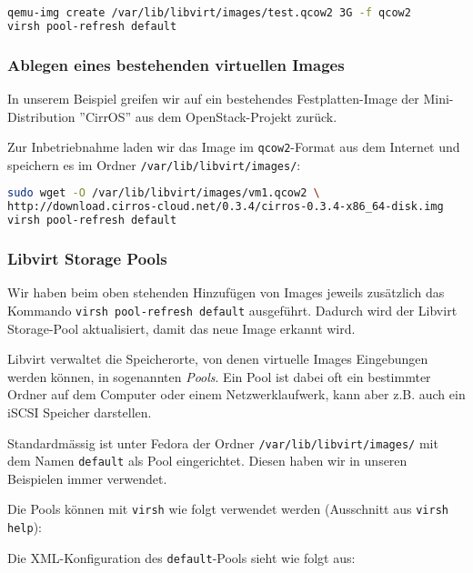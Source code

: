 \begin{lstlisting}[language=bash]
qemu-img create /var/lib/libvirt/images/test.qcow2 3G -f qcow2
virsh pool-refresh default
\end{lstlisting}


\subsubsection{Ablegen eines bestehenden virtuellen Images}

In unserem Beispiel greifen wir auf ein bestehendes Festplatten-Image der Mini-Distribution ''CirrOS'' aus dem OpenStack-Projekt zurück.

Zur Inbetriebnahme laden wir das Image im \lstinline|qcow2|-Format aus dem Internet und speichern es im Ordner \lstinline|/var/lib/libvirt/images/|:

\begin{lstlisting}[language=bash]
sudo wget -O /var/lib/libvirt/images/vm1.qcow2 \
http://download.cirros-cloud.net/0.3.4/cirros-0.3.4-x86_64-disk.img
virsh pool-refresh default
\end{lstlisting}

\subsubsection{Libvirt Storage Pools}

Wir haben beim oben stehenden Hinzufügen von Images jeweils zusätzlich das Kommando \lstinline|virsh pool-refresh default| ausgeführt. Dadurch wird der Libvirt Storage-Pool aktualisiert, damit das neue Image erkannt wird.

Libvirt verwaltet die Speicherorte, von denen virtuelle Images Eingebungen werden können, in sogenannten \emph{Pools}. Ein Pool ist dabei oft ein bestimmter Ordner auf dem Computer oder einem Netzwerklaufwerk, kann aber z.B. auch ein iSCSI Speicher darstellen.

Standardmässig ist unter Fedora der Ordner \lstinline|/var/lib/libvirt/images/| mit dem Namen \lstinline|default| als Pool eingerichtet. Diesen haben wir in unseren Beispielen immer verwendet.

Die Pools können mit \lstinline|virsh| wie folgt verwendet werden (Ausschnitt aus \lstinline|virsh help|):



Die XML-Konfiguration des \lstinline|default|-Pools sieht wie folgt aus:

